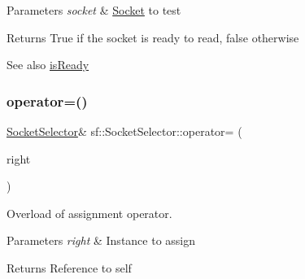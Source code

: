 \begin{DoxyParams}{Parameters}
{\em socket} & \mbox{\hyperlink{classsf_1_1_socket}{Socket}} to test\\
\hline
\end{DoxyParams}
\begin{DoxyReturn}{Returns}
True if the socket is ready to read, false otherwise
\end{DoxyReturn}
\begin{DoxySeeAlso}{See also}
\mbox{\hyperlink{classsf_1_1_socket_selector_a917a4bac708290a6782e6686fd3bf889}{is\+Ready}} \begin{DoxyVerb}\end{DoxyVerb}
 
\end{DoxySeeAlso}
\mbox{\label{classsf_1_1_socket_selector_ae6395c7a8d29a9ea14939cc5d1ba3a33}} 
\subsubsection{\texorpdfstring{operator=()}{operator=()}}
{\footnotesize\ttfamily \mbox{\hyperlink{classsf_1_1_socket_selector}{Socket\+Selector}}\& sf\+::\+Socket\+Selector\+::operator= (\begin{DoxyParamCaption}\item[{const \mbox{\hyperlink{classsf_1_1_socket_selector}{Socket\+Selector}} \&}]{right }\end{DoxyParamCaption})}



Overload of assignment operator. 


\begin{DoxyParams}{Parameters}
{\em right} & Instance to assign\\
\hline
\end{DoxyParams}
\begin{DoxyReturn}{Returns}
Reference to self \begin{DoxyVerb}\end{DoxyVerb}
 
\end{DoxyReturn}
\mbox{\label{classsf_1_1_socket_selector_a98b6ab693a65b82caa375639232357c1}} 

